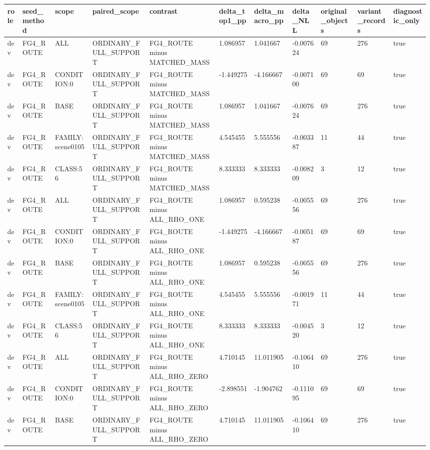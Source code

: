 \begin{tabular}{lllllllllll}
\toprule
role & seed\_method & scope & paired\_scope & contrast & delta\_top1\_pp & delta\_macro\_pp & delta\_NLL & original\_objects & variant\_records & diagnostic\_only \\
\midrule
dev & FG4\_ROUTE & ALL & ORDINARY\_FULL\_SUPPORT & FG4\_ROUTE minus MATCHED\_MASS & 1.086957 & 1.041667 & -0.007624 & 69 & 276 & true \\
dev & FG4\_ROUTE & CONDITION:0 & ORDINARY\_FULL\_SUPPORT & FG4\_ROUTE minus MATCHED\_MASS & -1.449275 & -4.166667 & -0.007100 & 69 & 69 & true \\
dev & FG4\_ROUTE & BASE & ORDINARY\_FULL\_SUPPORT & FG4\_ROUTE minus MATCHED\_MASS & 1.086957 & 1.041667 & -0.007624 & 69 & 276 & true \\
dev & FG4\_ROUTE & FAMILY:scene0105 & ORDINARY\_FULL\_SUPPORT & FG4\_ROUTE minus MATCHED\_MASS & 4.545455 & 5.555556 & -0.003387 & 11 & 44 & true \\
dev & FG4\_ROUTE & CLASS:56 & ORDINARY\_FULL\_SUPPORT & FG4\_ROUTE minus MATCHED\_MASS & 8.333333 & 8.333333 & -0.008209 & 3 & 12 & true \\
dev & FG4\_ROUTE & ALL & ORDINARY\_FULL\_SUPPORT & FG4\_ROUTE minus ALL\_RHO\_ONE & 1.086957 & 0.595238 & -0.005556 & 69 & 276 & true \\
dev & FG4\_ROUTE & CONDITION:0 & ORDINARY\_FULL\_SUPPORT & FG4\_ROUTE minus ALL\_RHO\_ONE & -1.449275 & -4.166667 & -0.005187 & 69 & 69 & true \\
dev & FG4\_ROUTE & BASE & ORDINARY\_FULL\_SUPPORT & FG4\_ROUTE minus ALL\_RHO\_ONE & 1.086957 & 0.595238 & -0.005556 & 69 & 276 & true \\
dev & FG4\_ROUTE & FAMILY:scene0105 & ORDINARY\_FULL\_SUPPORT & FG4\_ROUTE minus ALL\_RHO\_ONE & 4.545455 & 5.555556 & -0.001971 & 11 & 44 & true \\
dev & FG4\_ROUTE & CLASS:56 & ORDINARY\_FULL\_SUPPORT & FG4\_ROUTE minus ALL\_RHO\_ONE & 8.333333 & 8.333333 & -0.004520 & 3 & 12 & true \\
dev & FG4\_ROUTE & ALL & ORDINARY\_FULL\_SUPPORT & FG4\_ROUTE minus ALL\_RHO\_ZERO & 4.710145 & 11.011905 & -0.106410 & 69 & 276 & true \\
dev & FG4\_ROUTE & CONDITION:0 & ORDINARY\_FULL\_SUPPORT & FG4\_ROUTE minus ALL\_RHO\_ZERO & -2.898551 & -1.904762 & -0.111095 & 69 & 69 & true \\
dev & FG4\_ROUTE & BASE & ORDINARY\_FULL\_SUPPORT & FG4\_ROUTE minus ALL\_RHO\_ZERO & 4.710145 & 11.011905 & -0.106410 & 69 & 276 & true \\

\end{tabular}
